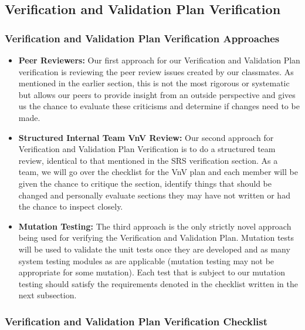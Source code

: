 \documentclass[12pt, titlepage]{article}
\begin{document}
\subsection{Verification and Validation Plan Verification}

\subsubsection{Verification and Validation Plan Verification Approaches}

\begin{itemize}

  \item{\textbf{Peer Reviewers:} Our first approach for our Verification and Validation Plan verification is reviewing the peer review issues created by our classmates. As
  mentioned in the earlier section, this is not the most rigorous or systematic but allows our peers to provide insight from an outside perspective and gives us the
  chance to evaluate these criticisms and determine if changes need to be made.}
  \item{\textbf{Structured Internal Team VnV Review:} Our second approach for Verification and Validation Plan Verification is to do a structured team review, identical
  to that mentioned in the SRS verification section. As a team, we will go over the checklist for the VnV plan and each member will be given the chance to critique
  the section, identify things that should be changed and personally evaluate sections they may have not written or had the chance to inspect closely.}
  \item{\textbf{Mutation Testing:} The third approach is the only strictly novel approach being used for verifying the Verification and Validation Plan.
  Mutation tests will be used to validate the unit tests once they are developed and as many system testing modules as are applicable (mutation testing
  may not be appropriate for some mutation). Each test that is subject to our mutation testing should satisfy the requirements denoted in the checklist written in
  the next subsection.}
\end{itemize}

\subsubsection{Verification and Validation Plan Verification Checklist}

\end{document}
